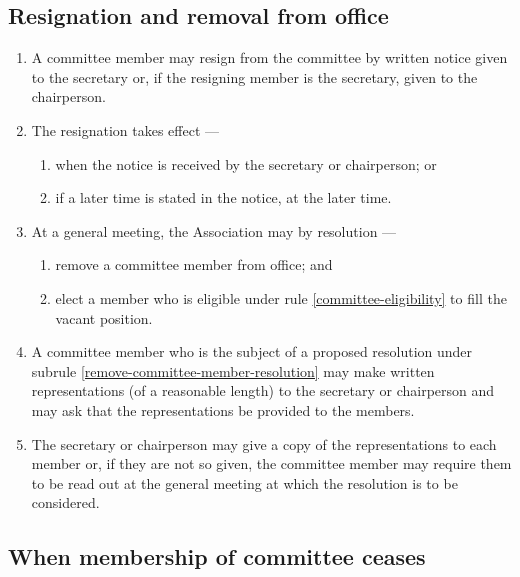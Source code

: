 \documentclass[../constitution.tex]{subfiles}
\begin{document}
\hypertarget{resignation-and-removal-from-office}{%
\subsection{Resignation and removal from office}\label{resignation-and-removal-from-office}}

\begin{enumerate}

\item A committee member may resign from the committee by written notice given to the secretary or, if the resigning member is the secretary, given to the chairperson.
\item The resignation takes effect ---

  \begin{enumerate}
  
  \item when the notice is received by the secretary or chairperson; or
  \item if a later time is stated in the notice, at the later time.
  \end{enumerate}
\item At a general meeting, the Association may by resolution --- 

  \begin{enumerate}
  
  \item remove a committee member from office; and \label{remove-committee-member-resolution}
  \item elect a member who is eligible under rule \ref{committee-eligibility} to fill the vacant position. \label{elect-committee-at-general-meeting}
  \end{enumerate}
\item A committee member who is the subject of a proposed resolution under subrule \ref{remove-committee-member-resolution} may make written representations (of a reasonable length) to the secretary or chairperson and may ask that the representations be provided to the members.
\item The secretary or chairperson may give a copy of the representations to each member or, if they are not so given, the committee member may require them to be read out at the general meeting at which the resolution is to be considered.
\end{enumerate}

\hypertarget{when-membership-of-committee-ceases}{%
\subsection{When membership of committee ceases}\label{when-membership-of-committee-ceases}}
\end{document}
